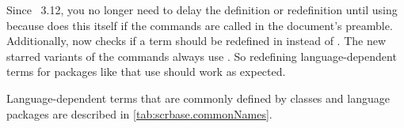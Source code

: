 Since \KOMAScript~3.12, you no longer need
to delay the definition or redefinition until
 using  because
 does this itself if the commands are called in the
document's preamble. Additionally,  now checks if a term
should be redefined in  instead of
. The new starred variants of the commands
always use . So redefining language-dependent
terms for packages like  that use
 should work as expected.

Language-dependent terms that are commonly defined by classes and language
packages are described in \autoref{tab:scrbase.commonNames}.

